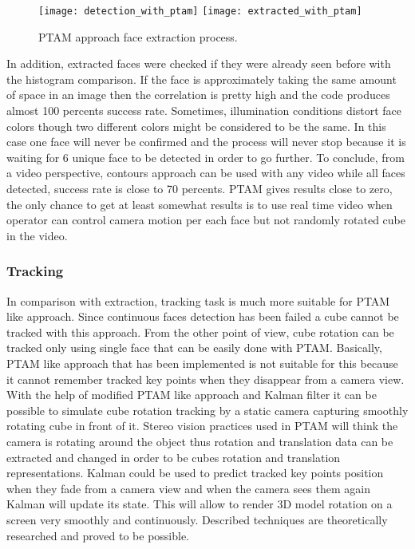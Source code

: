 \documentclass[../../main.tex]{subfiles}
\begin{document}
\begin{figure} [ht!]
    \begin{center}
        \texttt{[image: detection\_with\_ptam]}
        \texttt{[image: extracted\_with\_ptam]}
        \caption{\ac{PTAM} approach face extraction process.}
        \label{fig:ptam_approach_face_detection}
    \end{center}
\end{figure}

In addition, extracted faces were checked if they were already seen before with the histogram comparison. If the face is approximately taking the same amount of space in an image then the correlation is pretty high and the code produces almost 100 percents success rate. Sometimes, illumination conditions distort face colors though two different colors might be considered to be the same. In this case one face will never be confirmed and the process will never stop because it is waiting for 6 unique face to be detected in order to go further.
To conclude, from a video perspective, contours approach can be used with any video while all faces detected, success rate is close to 70 percents. \ac{PTAM} gives results close to zero, the only chance to get at least somewhat results is to use real time video when operator can control camera motion per each face but not randomly rotated cube in the video.

\subsubsection*{Tracking}

In comparison with extraction, tracking task is much more suitable for \ac{PTAM} like approach. Since continuous faces detection has been failed a cube cannot be tracked with this approach. From the other point of view, cube rotation can be tracked only using single face that can be easily done with \ac{PTAM}. Basically, \ac{PTAM} like approach that has been implemented is not suitable for this because it cannot remember tracked key points when they disappear from a camera view. With the help of modified \ac{PTAM} like approach and Kalman filter it can be possible to simulate cube rotation tracking by a static camera capturing smoothly rotating cube in front of it. Stereo vision practices used in \ac{PTAM} will think the camera is rotating around the object thus rotation and translation data can be extracted and changed in order to be cubes rotation and translation representations. Kalman could be used to predict tracked key points position when they fade from a camera view and when the camera sees them again Kalman will update its state. This will allow to render 3D model rotation on a screen very smoothly and continuously. Described techniques are theoretically researched and proved to be possible.
\end{document}
